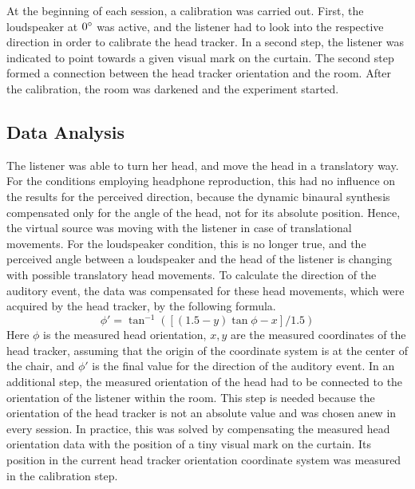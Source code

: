 At the beginning of each session, a calibration was carried out. First, the
loudspeaker at $0^\circ$ was active, and the listener had to look into the
respective direction in order to calibrate the head tracker.
In a second step, the listener
was indicated to point towards a given visual mark on the curtain. The
second step formed a connection between the head tracker orientation and the
room. After the calibration, the room was darkened and the
experiment started.

\subsection{Data Analysis}
%
The listener was able to turn her head, and move the head
in a translatory way. For the conditions employing
headphone reproduction, this had no influence on the results for the perceived
direction, because the dynamic binaural synthesis compensated only for the angle
of the head, not for its absolute position. Hence, the virtual source was moving with
the listener in case of translational movements.
For the loudspeaker condition, this is no
longer true, and the perceived angle between a loudspeaker and the head of
the listener is changing with possible translatory head movements.
To calculate the direction of the auditory event, the data was
compensated for these head movements, which were acquired by the head tracker,
by the following formula.
\begin{equation}
    \phi' = \tan^{-1}\left( [ (1.5-y) \tan\phi - x ] / 1.5 \right)
\end{equation} 
Here $\phi$ is the measured head orientation, $x,y$ are the measured 
coordinates of the head tracker, assuming that the origin of the coordinate
system is at the center of the chair, and $\phi'$ is the final value for the
direction of the auditory event.
In an additional step, the measured orientation of the head had to be connected
to the orientation of the listener within the room. This step is needed
because the orientation of the head tracker is not an absolute value and was
chosen anew in every session.
In practice, this was solved by compensating
the measured head orientation data with the position of a tiny visual mark on
the curtain. Its position in the current head tracker orientation coordinate
system was measured in the calibration step.


